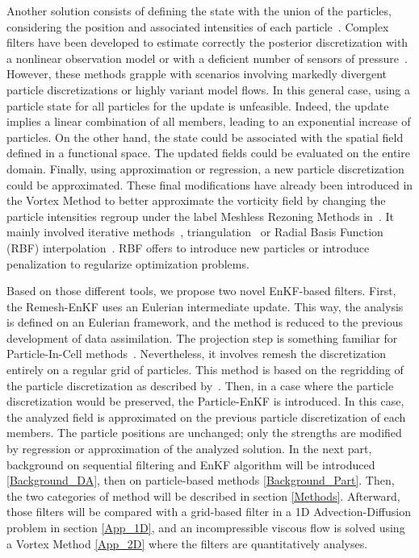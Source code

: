 Another solution consists of defining the state with the union of the particles, considering the position and associated intensities of each particle~\cite{darakananda_data-assimilated_2018}. Complex filters have been developed to estimate correctly the posterior discretization with a nonlinear observation model or with a deficient number of sensors of pressure~\cite{le_provost_low-rank_2021}.
However, these methods grapple with scenarios involving markedly divergent particle discretizations or highly variant model flows. In this general case, using a particle state for all particles for the update is unfeasible. Indeed, the update implies a linear combination of all members, leading to an exponential increase of particles.
On the other hand, the state could be associated with the spatial field defined in a functional space. The updated fields could be evaluated on the entire domain. Finally, using approximation or regression, a new particle discretization could be approximated. These final modifications have already been introduced in the Vortex Method to better approximate the vorticity field by changing the particle intensities regroup under the label Meshless Rezoning Methods in~\cite{mimeau_review_2021}. It mainly involved iterative methods~\cite{beale_accuracy_1988},  triangulation~\cite{russo_1994} or Radial Basis Function (RBF) interpolation~\cite{barba_lorena_a_vortex_2004,sperotto_2021}. RBF offers to introduce new particles or introduce penalization to regularize optimization problems.\newline

Based on those different tools, we propose two novel EnKF-based filters. First, the Remesh-EnKF uses an Eulerian intermediate update. This way, the analysis is defined on an Eulerian framework, and the method is reduced to the previous development of data assimilation. The projection step is something familiar for Particle-In-Cell methods~\cite{sulsky_particle_1994,brackbill_flip_1988}. Nevertheless, it involves remesh the discretization entirely on a regular grid of particles. This method is based on the regridding of the particle discretization as described by~\cite{cottet_multi-purpose_1999}.
Then, in a case where the particle discretization would be preserved, the Particle-EnKF is introduced. In this case, the analyzed field is approximated on the previous particle discretization of each members. The particle positions are unchanged; only the strengths are modified by regression or approximation of the analyzed solution.
In the next part, background on sequential filtering and EnKF algorithm will be introduced \ref{Background_DA}, then on particle-based methods \ref{Background_Part}. Then, the two categories of method will be described in section \ref{Methods}. Afterward, those filters will be compared with a grid-based filter in a 1D Advection-Diffusion problem in section \ref{App_1D}, and an incompressible viscous flow is solved using a Vortex Method \ref{App_2D} where the filters are quantitatively analyses.






